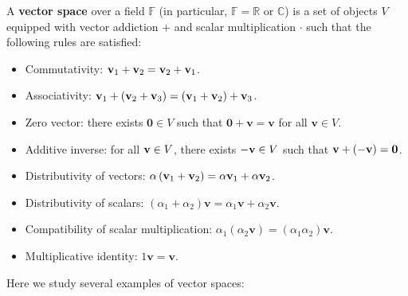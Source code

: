 \begin{definition} A {\bf vector space} over a field \(\mathbb{F}\) (in particular, \(\mathbb{F} = \mathbb{R}\) or \(\mathbb{C}\)) is a set of objects \(V\) equipped with vector addiction $+$ and scalar multiplication $\cdot$ such that the following rules are satisfied:
\begin{itemize}
    \item Commutativity: \({\bf v}_1 + {\bf v}_2 = {\bf v}_2 + {\bf v}_1\).

    \item Associativity: \({\bf v}_1 + \left( {{\bf v}_2 + {\bf v}_{3}}\right)  = \left( {{\bf v}_1 + {\bf v}_2}\right)  + {\bf v}_{3}\).

    \item Zero vector: there exists \(\mathbf{0} \in  V\) such that \(\mathbf{0} + \mathbf{v} = \mathbf{v}\) for all \(\mathbf{v} \in  V\).

    \item Additive inverse: for all ${\bf v} \in V$, there exists \(-{\bf v} \in V\) such that ${\bf v} + (-{\bf v}) = {\bf 0}$.

    \item Distributivity of vectors: \(\alpha \left( {{\bf v}_1 + {\bf v}_2}\right)  = \alpha {\bf v}_1 + \alpha {\bf v}_2\).

    \item Distributivity of scalars: \(\left( {\alpha_1 + \alpha_2}\right) \mathbf{v} = \alpha_1\mathbf{v} + \alpha_2\mathbf{v}\).

    \item Compatibility of scalar multiplication: \(\alpha_1\left( {\alpha_2\mathbf{v}}\right)  = \left( {\alpha_1\alpha_2}\right) \mathbf{v}\).

    \item Multiplicative identity: \(1\mathbf{v} = \mathbf{v}\).
\end{itemize}
\end{definition}

Here we study several examples of vector spaces:

